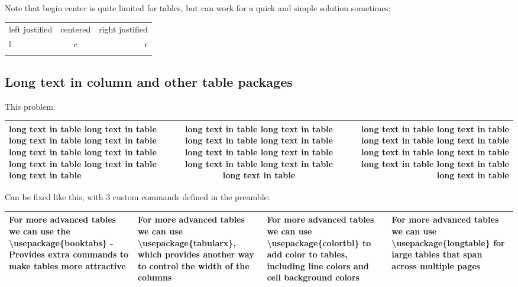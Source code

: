 \documentclass[12pt]{article}
\begin{document}
\noindent Note that begin center is quite limited for tables, but can work for a quick and simple solution sometimes: \\
\begin{center}
    \begin{tabular}{ | l |c r| }
        \hhline{ | - | - | - | }
        left justified & centered & right justified \\
        \hhline{ | - | ~ - | }
        l & c & r \\
        \hhline{ | - | ~ - | }
    \end{tabular}
\end{center}

\subsection{Long text in column and other table packages}

This problem: \\
\begin{tabular}{ | l | c | r | }
    \hline
    long text in table long text in table long text in table long text in table long text in table long text in table long text in table long text in table long text in table &
    long text in table long text in table long text in table long text in table long text in table long text in table long text in table long text in table long text in table &
    long text in table long text in table long text in table long text in table long text in table long text in table long text in table long text in table long text in table
    \\
    \hline
\end{tabular}

\noindent Can be fixed like this, with 3 custom commands defined in the preamble:

\begin{tabular}{ | L{5cm} | C{4cm} | R{3cm} | L{4cm} | }
    \hline
    For more advanced tables we can use the \textbf{\textbackslash usepackage\{booktabs\}} - Provides extra commands to make tables more attractive &
    For more advanced tables we can use \textbf{\textbackslash usepackage\{tabularx\}}, which provides another way to control the width of the columns &
    For more advanced tables we can use \textbf{\textbackslash usepackage\{colortbl\}} to add color to tables, including line colors and cell background colors &
    For more advanced tables we can use \textbf{\textbackslash usepackage\{longtable\}} for large tables that span across multiple pages
    \\
    \hline
\end{tabular}
\end{document}

